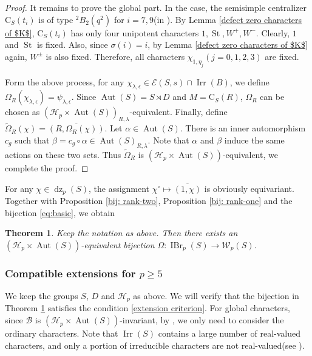 \documentclass[11pt,a4paper]{article}
\numberwithin{equation}{section}
\newtheorem{theorem}{Theorem}[section]
\theoremstyle{definition}
\theoremstyle{remark}
\newcommand{\Irr}{\operatorname{Irr}}
\newcommand{\IBr}{\operatorname{IBr}}
\newcommand{\Aut}{\operatorname{Aut}}
\DeclareMathOperator{\St}{St}
\newcommand{\dz}{\operatorname{dz}}
\newcommand{\HH}{\mathcal H}
\newcommand{\WW}{\mathcal W}
\newcommand{\CC}{\mathrm C}
\begin{document}
\begin{proof}
It remains to prove the global part. In the case,
the semisimple centralizer $\CC_S(t_i)$  is of type 
${}^2B_2(q^2)$ for $i=7,9$(in \cite[TABLE I]{An}).
By Lemma \ref{defect zero characters of $K$}, $\CC_S(t_i)$ has only four unipotent characters $1,\St,W^+,W^-$. Clearly, \(1\) and \(\St\) is fixed. Also, since $\sigma(i)=i$, by Lemma \ref{defect zero characters of $K$} again,  $W^{\pm}$ is also fixed. Therefore, all characters $\chi_{1,\eta_j}(j=0,1,2,3)$ are fixed.

Form the above process, for any $\chi_{\lambda,\epsilon}\in\mathcal{E}(S,s)\cap \Irr(B)$, 
we define $\Omega_R(\chi_{\lambda,\epsilon})=\psi_{\lambda,\epsilon}$. Since $\Aut(S)=S\rtimes D$ and $M=\CC_S(R)$,  $\Omega_R$ can be chosen as  $(\HH_p\times\Aut(S))_{R,\lambda}$-equivalent.
Finally, define 
$\widetilde\Omega_R(\chi)=\overline{(R,\Omega_R(\chi))}$. Let \(\alpha\in\Aut(S)\). There is an inner automorphism \(c_g\) such that $\beta=c_g\circ\alpha\in\Aut(S)_{R,\lambda}$. Note that \(\alpha\) and \(\beta\) induce the same actions on these two sets. Thus $\widetilde \Omega_R$ is $(\HH_p\times \Aut(S))$-equivalent, we complete the proof.
\end{proof}
For any $\chi\in\dz_p(S)$, the assignment $\chi^\circ\mapsto\overline{(1,\chi)}$ is obviously  equivariant. Together with Proposition \ref{bij: rank-two}, Proposition \ref{bij: rank-one} and the bijection \eqref{eq:basic}, we obtain
\begin{theorem}\label{equ:bijection when p>=5}
Keep the notation as above. Then there exists an $(\HH_p\times\Aut(S))$-equivalent bijection
$\Omega:\IBr_p(S)\longrightarrow\WW_p(S)$.
\end{theorem}

\subsubsection{Compatible extensions for \texorpdfstring{$p\geq5$}{p >= 5}}
We keep the groups $S$, $D$ and $\HH_p$ as above. We will verify that the bijection in Theorem \ref{equ:bijection when p>=5} satisfies the condition \eqref{extension criterion}. For global characters, since $\mathcal{B}$ is $(\HH_p\times \Aut(S))$-invariant, by \cite[Lemma 10.4(2)]{FFZ}, we only need to consider the ordinary characters. Note that \(\Irr(S)\) contains a large number of real-valued characters, and only a portion of irreducible characters are not real-valued(see \cite{Himstedt}).
\end{document}
